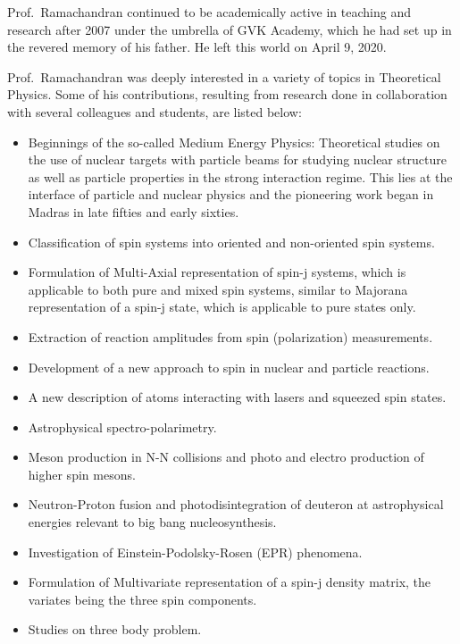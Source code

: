 Prof.\ Ramachandran continued to be academically active in teaching and research after 2007 under the umbrella of GVK Academy, which he had set up in the revered memory of his father. He left this world on April 9, 2020.

Prof.\ Ramachandran was deeply interested in a variety of topics in Theoretical Physics. Some of his contributions, resulting from research done in collaboration with several colleagues and students, are listed below:
\begin{itemize}
\item Beginnings of the so-called Medium Energy Physics: Theoretical studies on the use of nuclear targets with particle beams for studying nuclear structure as well as particle properties in the strong interaction regime. This lies at the interface of particle and nuclear physics and the pioneering work began in Madras in late fifties and early sixties.

\item Classification of spin systems into oriented and non-oriented spin systems.

\item Formulation of Multi-Axial representation of spin-j systems, which is applicable to both pure and mixed spin systems, similar to Majorana representation of a spin-j state, which is applicable to pure states only.

\item Extraction of reaction amplitudes from spin (polarization) measurements.

\item Development of a new approach to spin in nuclear and particle reactions.

\item A new description of atoms interacting with lasers and squeezed spin states.

\item Astrophysical spectro-polarimetry.

\item Meson production in N-N collisions and photo and electro production of higher spin mesons.

\item Neutron-Proton fusion and photodisintegration of deuteron at astrophysical energies relevant to big bang nucleosynthesis.

\item Investigation of Einstein-Podolsky-Rosen (EPR) phenomena.

\item Formulation of Multivariate representation of a spin-j density matrix, the variates being the three spin components.

\item Studies on three body problem.
\end{itemize}

